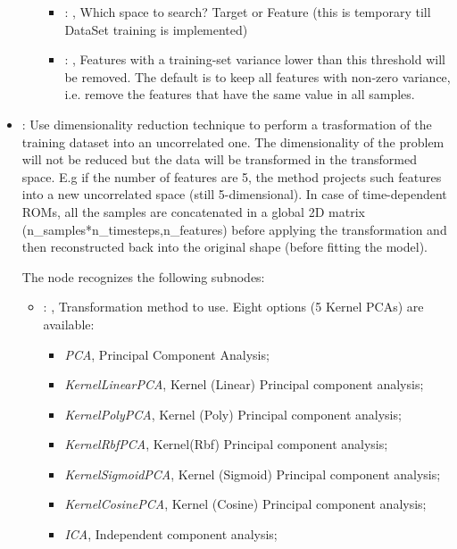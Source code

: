 \begin{itemize}
\begin{itemize}
\begin{itemize}
            \item {}: , 
              Which space to search? Target or Feature (this is temporary till DataSet training is
              implemented)

            \item {}: , 
              Features with a training-set variance lower than this threshold                   will
              be removed. The default is to keep all features with non-zero
              variance, i.e. remove the features that have the same value in all
              samples.
          \end{itemize}
      \end{itemize}

    \item {}:
      Use dimensionality reduction technique to perform a trasformation of the training dataset
      into an uncorrelated one. The dimensionality of the problem will not be reduced but
      the data will be transformed in the transformed space. E.g if the number of features
      are 5, the method projects such features into a new uncorrelated space (still 5-dimensional).
      In case of time-dependent ROMs, all the samples are concatenated in a global 2D matrix
      (n\_samples*n\_timesteps,n\_features) before applying the transformation and then reconstructed
      back into the original shape (before fitting the model).

      The  node recognizes the following subnodes:
      \begin{itemize}
        \item {}: , 
          Transformation method to use. Eight options (5 Kernel PCAs) are available:
          \begin{itemize}                     \item \textit{PCA}, Principal Component Analysis;
          \item \textit{KernelLinearPCA}, Kernel (Linear) Principal component analysis;
          \item \textit{KernelPolyPCA}, Kernel (Poly) Principal component analysis;
          \item \textit{KernelRbfPCA}, Kernel(Rbf) Principal component analysis;
          \item \textit{KernelSigmoidPCA}, Kernel (Sigmoid) Principal component analysis;
          \item \textit{KernelCosinePCA}, Kernel (Cosine) Principal component analysis;
          \item \textit{ICA}, Independent component analysis;                    \end{itemize}


\end{itemize}
\end{itemize}
